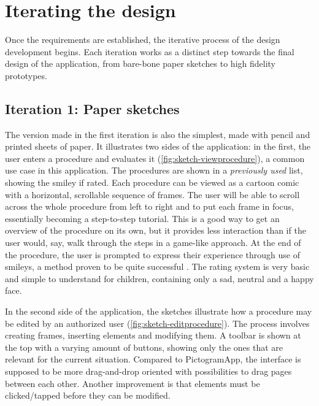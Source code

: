\chapter{Iterating the design}
\label{ch:iterating}

Once the requirements are established, the iterative process of the design development begins. Each iteration works as a distinct step towards the final design of the application, from bare-bone paper sketches to high fidelity prototypes.

\section{Iteration 1: Paper sketches}
\label{sec:iteration1}

The version made in the first iteration is also the simplest, made with pencil and printed sheets of paper. It illustrates two sides of the application: in the first, the user enters a procedure and evaluates it (\autoref{fig:sketch-viewprocedure}), a common use case in this application. The procedures are shown in a \emph{previously used} list, showing the smiley if rated. Each procedure can be viewed as a cartoon comic with a horizontal, scrollable sequence of frames. The user will be able to scroll across the whole procedure from left to right and to put each frame in focus, essentially becoming a step-to-step tutorial. This is a good way to get an overview of the procedure on its own, but it provides less interaction than if the user would, say, walk through the steps in a game-like approach. At the end of the procedure, the user is prompted to express their experience through use of smileys, a method proven to be quite successful \parencite{stalberg2016}. The rating system is very basic and simple to understand for children, containing only a sad, neutral and a happy face.

In the second side of the application, the sketches illustrate how a procedure may be edited by an authorized user (\autoref{fig:sketch-editprocedure}). The process involves creating frames, inserting elements and modifying them. A toolbar is shown at the top with a varying amount of buttons, showing only the ones that are relevant for the current situation. Compared to PictogramApp, the interface is supposed to be more drag-and-drop oriented with possibilities to drag pages between each other. Another improvement is that elements must be clicked/tapped before they can be modified.

